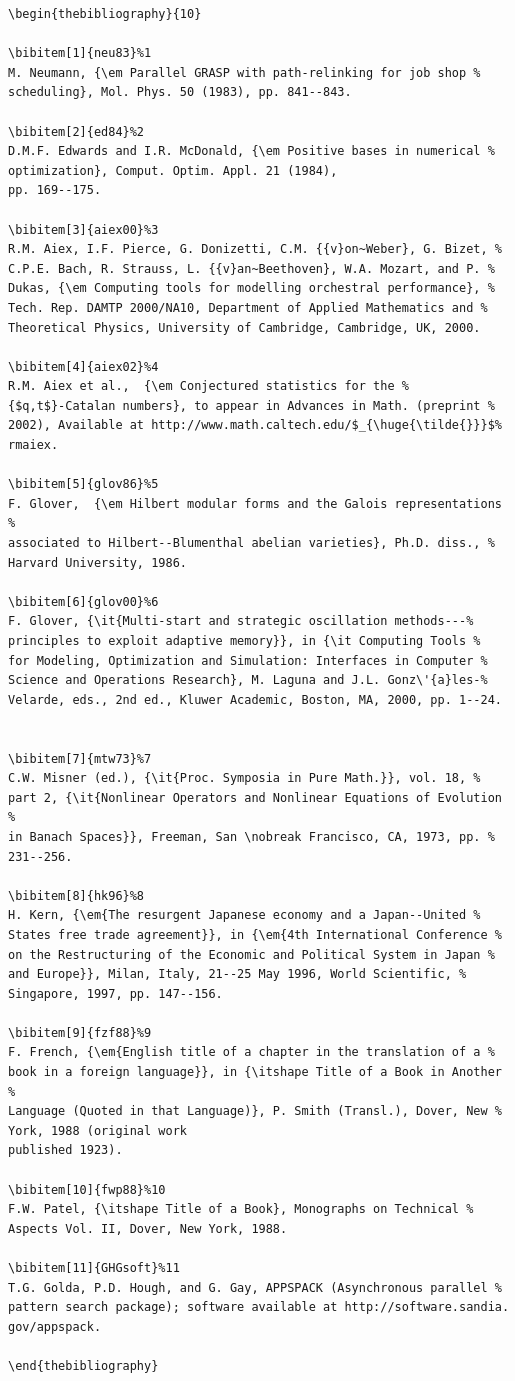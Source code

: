 \documentclass[]{tMAM2e}
\begin{document}
\begin{verbatim}
\begin{thebibliography}{10}

\bibitem[1]{neu83}%1
M. Neumann, {\em Parallel GRASP with path-relinking for job shop %
scheduling}, Mol. Phys. 50 (1983), pp. 841--843.

\bibitem[2]{ed84}%2
D.M.F. Edwards and I.R. McDonald, {\em Positive bases in numerical %
optimization}, Comput. Optim. Appl. 21 (1984),
pp. 169--175.

\bibitem[3]{aiex00}%3
R.M. Aiex, I.F. Pierce, G. Donizetti, C.M. {{v}on~Weber}, G. Bizet, %
C.P.E. Bach, R. Strauss, L. {{v}an~Beethoven}, W.A. Mozart, and P. %
Dukas, {\em Computing tools for modelling orchestral performance}, %
Tech. Rep. DAMTP 2000/NA10, Department of Applied Mathematics and %
Theoretical Physics, University of Cambridge, Cambridge, UK, 2000.

\bibitem[4]{aiex02}%4
R.M. Aiex et al.,  {\em Conjectured statistics for the %
{$q,t$}-Catalan numbers}, to appear in Advances in Math. (preprint %
2002), Available at http://www.math.caltech.edu/$_{\huge{\tilde{}}}$%
rmaiex.

\bibitem[5]{glov86}%5
F. Glover,  {\em Hilbert modular forms and the Galois representations %
associated to Hilbert--Blumenthal abelian varieties}, Ph.D. diss., %
Harvard University, 1986.

\bibitem[6]{glov00}%6
F. Glover, {\it{Multi-start and strategic oscillation methods---%
principles to exploit adaptive memory}}, in {\it Computing Tools %
for Modeling, Optimization and Simulation: Interfaces in Computer %
Science and Operations Research}, M. Laguna and J.L. Gonz\'{a}les-%
Velarde, eds., 2nd ed., Kluwer Academic, Boston, MA, 2000, pp. 1--24.


\bibitem[7]{mtw73}%7
C.W. Misner (ed.), {\it{Proc. Symposia in Pure Math.}}, vol. 18, %
part 2, {\it{Nonlinear Operators and Nonlinear Equations of Evolution %
in Banach Spaces}}, Freeman, San \nobreak Francisco, CA, 1973, pp. %
231--256.

\bibitem[8]{hk96}%8
H. Kern, {\em{The resurgent Japanese economy and a Japan--United %
States free trade agreement}}, in {\em{4th International Conference %
on the Restructuring of the Economic and Political System in Japan %
and Europe}}, Milan, Italy, 21--25 May 1996, World Scientific, %
Singapore, 1997, pp. 147--156.

\bibitem[9]{fzf88}%9
F. French, {\em{English title of a chapter in the translation of a %
book in a foreign language}}, in {\itshape Title of a Book in Another %
Language (Quoted in that Language)}, P. Smith (Transl.), Dover, New %
York, 1988 (original work
published 1923).

\bibitem[10]{fwp88}%10
F.W. Patel, {\itshape Title of a Book}, Monographs on Technical %
Aspects Vol. II, Dover, New York, 1988.

\bibitem[11]{GHGsoft}%11
T.G. Golda, P.D. Hough, and G. Gay, APPSPACK (Asynchronous parallel %
pattern search package); software available at http://software.sandia.
gov/appspack.

\end{thebibliography}
\end{verbatim}
\end{document}
